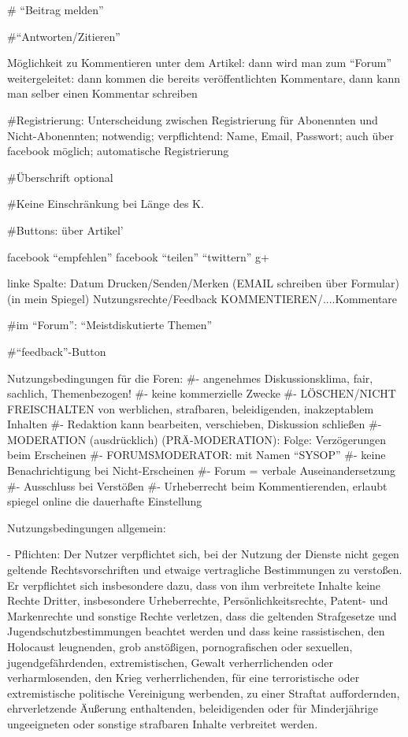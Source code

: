 # ``Beitrag melden''

#``Antworten/Zitieren''

Möglichkeit zu Kommentieren unter dem Artikel: dann wird man zum ``Forum'' weitergeleitet: dann kommen die bereits veröffentlichten Kommentare, dann kann man selber einen Kommentar schreiben

#Registrierung: Unterscheidung zwischen Registrierung für Abonennten und Nicht-Abonennten; notwendig; verpflichtend: Name, Email, Passwort; auch über facebook möglich; automatische Registrierung

#Überschrift optional

#Keine Einschränkung bei Länge des K.

#Buttons: über Artikel'

	facebook ``empfehlen''
	facebook ``teilen''
	``twittern''
	g+
	
linke Spalte: 
	Datum
	Drucken/Senden/Merken (EMAIL schreiben über Formular) (in mein Spiegel)
	Nutzungsrechte/Feedback
	KOMMENTIEREN/....Kommentare


	
#im ``Forum'': ``Meistdiskutierte Themen''

#``feedback''-Button

Nutzungsbedingungen für die Foren:
#- angenehmes Diskussionsklima, fair, sachlich, Themenbezogen!
#- keine kommerzielle Zwecke
#- LÖSCHEN/NICHT FREISCHALTEN von werblichen, strafbaren, beleidigenden, inakzeptablem Inhalten
#- Redaktion kann bearbeiten, verschieben, Diskussion schließen
#- MODERATION (ausdrücklich) (PRÄ-MODERATION): Folge: Verzögerungen beim Erscheinen 
#- FORUMSMODERATOR: mit Namen ``SYSOP'' 
#- keine Benachrichtigung bei Nicht-Erscheinen
#- Forum = verbale Auseinandersetzung
#- Ausschluss bei Verstößen
#- Urheberrecht beim Kommentierenden, erlaubt spiegel online die dauerhafte Einstellung



Nutzungsbedingungen allgemein:

- Pflichten: Der Nutzer verpflichtet sich, bei der Nutzung der Dienste nicht gegen geltende Rechtsvorschriften und etwaige vertragliche Bestimmungen zu verstoßen. Er verpflichtet sich insbesondere dazu, dass von ihm verbreitete Inhalte keine Rechte Dritter, insbesondere Urheberrechte, Persönlichkeitsrechte, Patent- und Markenrechte und sonstige Rechte verletzen, dass die geltenden Strafgesetze und Jugendschutzbestimmungen beachtet werden und dass keine rassistischen, den Holocaust leugnenden, grob anstößigen, pornografischen oder sexuellen, jugendgefährdenden, extremistischen, Gewalt verherrlichenden oder verharmlosenden, den Krieg verherrlichenden, für eine terroristische oder extremistische politische Vereinigung werbenden, zu einer Straftat auffordernden, ehrverletzende Äußerung enthaltenden, beleidigenden oder für Minderjährige ungeeigneten oder sonstige strafbaren Inhalte verbreitet werden.

